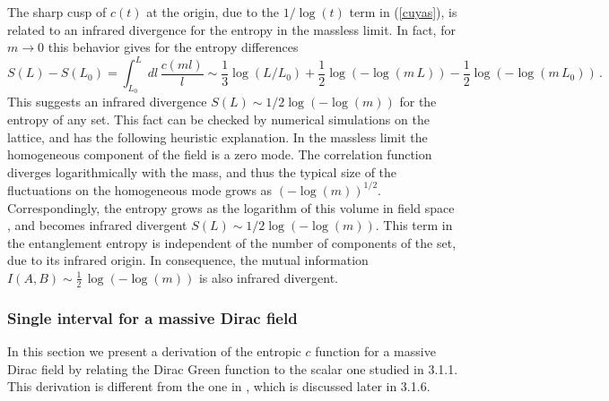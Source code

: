\documentclass[a4paper]{article}
\begin{document}
The sharp cusp of $c(t)$ at the origin, due to the $1/\log(t)$ term in (\ref{cuyas}), is related to an infrared divergence for the entropy in the massless limit. In fact, for $m\rightarrow 0$ this behavior gives for the entropy differences
\begin{equation}
S(L)-S(L_0)=\int_{L_0}^L dl\, \frac{c(m l)}{l}\sim
\frac{1}{3}\log(L/L_0)+\frac{1}{2} \log\left(-\log(m\,L)\right)-\frac{1}{2} \log\left(-\log(m\,L_0)\right)\,.
\end{equation}    
 This suggests an infrared divergence $S(L)\sim 1/2 \log(-\log(m))$ for the entropy of any set. This fact can be checked by numerical simulations on the lattice, and has the following heuristic explanation. In the massless limit the homogeneous component of the field is a zero mode. The correlation function diverges logarithmically with the mass, and thus the typical size of the fluctuations on the homogeneous mode grows as $(-\log (m))^{1/2}$. Correspondingly, the entropy grows as the logarithm of this volume in field space \cite{unruh1}, and    
 becomes infrared divergent $S(L)\sim 1/2\log(-\log(m))$. This term in the entanglement entropy is  independent of the number of components of the set, due to its infrared origin. In consequence, the mutual information $I(A,B)\sim \frac{1}{2}\,\log(-\log(m))$ is also infrared divergent.
 

\subsubsection{Single interval for a massive Dirac field}
In this section we present a derivation of the entropic $c$ function for a massive Dirac field by relating the Dirac Green function to the scalar one studied in 3.1.1. This derivation is different from the one in \cite{fermion}, which is discussed later in 3.1.6.
\end{document}
